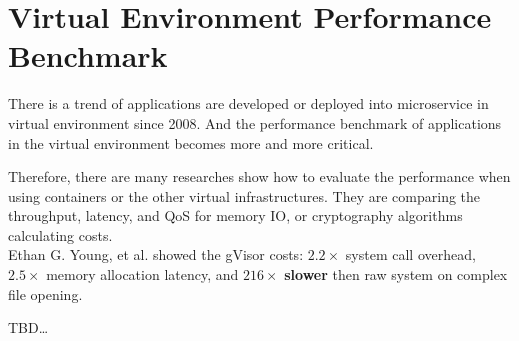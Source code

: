 \section{Virtual Environment Performance Benchmark}
There is a trend of applications are developed or deployed into microservice in virtual
environment since 2008. And the performance benchmark of applications in the virtual
environment becomes more and more critical.

Therefore, there are many researches show how to evaluate the performance when using containers or
the other virtual infrastructures\cite{7371699,KOZHIRBAYEV2017175,7095802,234857}. They are
comparing the throughput, latency, and QoS for memory IO, or cryptography algorithms
calculating costs.\\

Ethan G. Young, et al.\cite{234857} showed the gVisor costs: $2.2\times$ system call overhead,
$2.5\times$ memory allocation latency, and $216\times$ \textbf{slower} then raw system on
complex file opening.

TBD\dots
